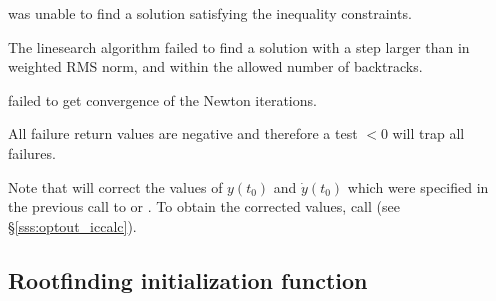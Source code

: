{{\begin{args}
  \item[\Id{IDA\_CONSTR\_FAIL}]
     was unable to find a solution    
    satisfying the inequality constraints.     
                                                                 
  \item[\Id{IDA\_LINESEARCH\_FAIL}]
    The linesearch algorithm failed to find a solution with a step larger than 
     in weighted RMS norm, and within the allowed number of backtracks.
 
  \item[\Id{IDA\_CONV\_FAIL}]
     failed to get convergence of the Newton iterations.

  \end{args} 
}
{
  All failure return values are negative and therefore a test  $< 0$
  will trap all  failures.

  Note that  will correct the values of $y(t_0)$ and $\dot{y}(t_0)$
  which were specified in the previous call to  or .
  To obtain the corrected values, call  (see \S\ref{sss:optout_iccalc}).
}


\subsection{Rootfinding initialization function}\label{ss:idarootinit}

}
